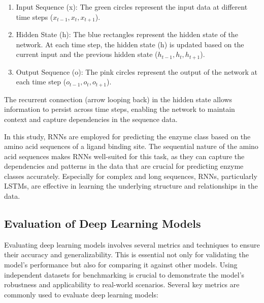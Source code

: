 \begin{enumerate}
    \item Input Sequence (x): The green circles represent the input data at different time steps ($ x_{t-1}, x_{t}, x_{t+1} $).
    \item Hidden State (h): The blue rectangles represent the hidden state of the network. At each time step, the hidden state (h) is updated based on the current input and the previous hidden state ($h_{t-1}, h_{t}, h_{t+1}$).
    \item Output Sequence (o): The pink circles represent the output of the network at each time step ($o_{t-1}, o_{t}, o_{t+1}$).
\end{enumerate}

The recurrent connection (arrow looping back) in the hidden state allows information to persist across time steps, enabling the network to maintain context and capture dependencies in the sequence data.

In this study, RNNs are employed for predicting the enzyme class based on the amino acid sequences of a ligand binding site. The sequential nature of the amino acid sequences makes RNNs well-suited for this task, as they can capture the dependencies and patterns in the data that are crucial for predicting enzyme classes accurately. Especially for complex and long sequences, RNNs, particularly LSTMs, are effective in learning the underlying structure and relationships in the data.

\subsection{Evaluation of Deep Learning Models}
\label{sec:Evaluation of Deep Learning Models}

Evaluating deep learning models involves several metrics and techniques to ensure their accuracy and generalizability. This is essential not only for validating the model’s performance but also for comparing it against other models. Using independent datasets for benchmarking is crucial to demonstrate the model's robustness and applicability to real-world scenarios. Several key metrics are commonly used to evaluate deep learning models:

